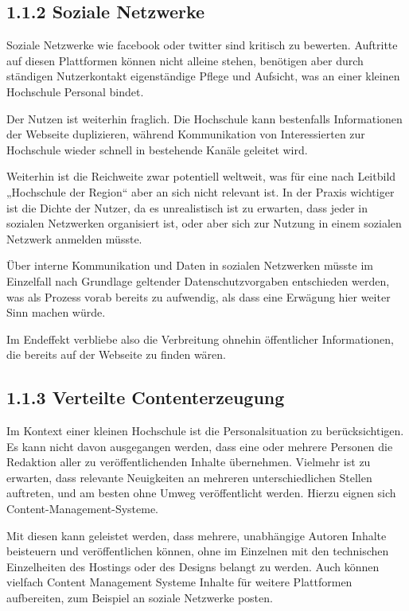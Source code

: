 \documentclass[a4paper]{article}
\begin{document}
\subsection{1.1.2 Soziale Netzwerke}
{\sffamily
Soziale Netzwerke wie facebook oder twitter sind kritisch zu bewerten. Auftritte auf diesen Plattformen können nicht
alleine stehen, benötigen aber durch ständigen Nutzerkontakt eigenständige Pflege und Aufsicht, was an einer kleinen
Hochschule Personal bindet.}

{\sffamily
Der Nutzen ist weiterhin fraglich. Die Hochschule kann bestenfalls Informationen der Webseite duplizieren, während
Kommunikation von Interessierten zur Hochschule wieder schnell in bestehende Kanäle geleitet wird.}

{\sffamily
Weiterhin ist die Reichweite zwar potentiell weltweit, was für eine nach Leitbild „Hochschule der Region“ aber an sich
nicht relevant ist. In der Praxis wichtiger ist die Dichte der Nutzer, da es unrealistisch ist zu erwarten, dass jeder
in sozialen Netzwerken organisiert ist, oder aber sich zur Nutzung in einem sozialen Netzwerk anmelden müsste.}

{\sffamily
Über interne Kommunikation und Daten in sozialen Netzwerken müsste im Einzelfall nach Grundlage geltender
Datenschutzvorgaben entschieden werden, was als Prozess vorab bereits zu aufwendig, als dass eine Erwägung hier weiter
Sinn machen würde.}

{\sffamily
Im Endeffekt verbliebe also die Verbreitung ohnehin öffentlicher Informationen, die bereits auf der Webseite zu finden
wären.}

\subsection{1.1.3 Verteilte Contenterzeugung}
{\sffamily
Im Kontext einer kleinen Hochschule ist die Personalsituation zu berücksichtigen. Es kann nicht davon ausgegangen
werden, dass eine oder mehrere Personen die Redaktion aller zu veröffentlichenden Inhalte übernehmen. Vielmehr ist zu
erwarten, dass relevante Neuigkeiten an mehreren unterschiedlichen Stellen auftreten, und am besten ohne Umweg
veröffentlicht werden. Hierzu eignen sich Content-Management-Systeme.}

{\sffamily
Mit diesen kann geleistet werden, dass mehrere, unabhängige Autoren Inhalte beisteuern und veröffentlichen können, ohne
im Einzelnen mit den technischen Einzelheiten des Hostings oder des Designs belangt zu werden. Auch können vielfach
Content Management Systeme Inhalte für weitere Plattformen aufbereiten, zum Beispiel an soziale Netzwerke posten.}
\end{document}
